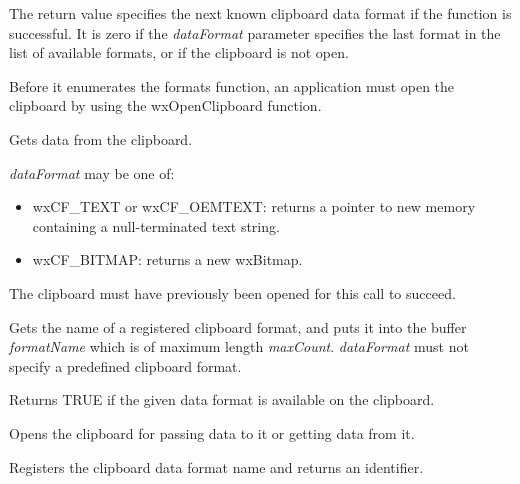 The return value specifies the next known clipboard data format if the
function is successful. It is zero if the {\it dataFormat} parameter specifies
the last  format in the list of available formats, or if the clipboard
is not open. 

Before it enumerates the formats function, an application must open the clipboard by using the 
wxOpenClipboard function. 



Gets data from the clipboard.

{\it dataFormat} may be one of:

\begin{itemize}\itemsep=0pt
\item wxCF\_TEXT or wxCF\_OEMTEXT: returns a pointer to new memory containing a null-terminated text string.
\item wxCF\_BITMAP: returns a new wxBitmap.
\end{itemize}

The clipboard must have previously been opened for this call to succeed.



Gets the name of a registered clipboard format, and puts it into the buffer {\it formatName} which is of maximum
length {\it maxCount}. {\it dataFormat} must not specify a predefined clipboard format.



Returns TRUE if the given data format is available on the clipboard.



Opens the clipboard for passing data to it or getting data from it.



Registers the clipboard data format name and returns an identifier.

